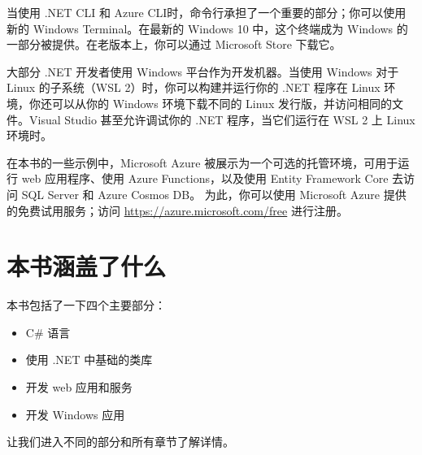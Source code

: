 当使用 .NET CLI 和 Azure CLI时，命令行承担了一个重要的部分；你可以使用新的 Windows Terminal。在最新的 Windows 10 中，这个终端成为 Windows 的一部分被提供。在老版本上，你可以通过 Microsoft Store 下载它。

大部分 .NET 开发者使用 Windows 平台作为开发机器。当使用 Windows 对于 Linux 的子系统（WSL 2）时，你可以构建并运行你的 .NET 程序在 Linux 环境，你还可以从你的 Windows 环境下载不同的 Linux 发行版，并访问相同的文件。Visual Studio 甚至允许调试你的 .NET 程序，当它们运行在 WSL 2 上 Linux 环境时。

在本书的一些示例中，Microsoft Azure 被展示为一个可选的托管环境，可用于运行 web 应用程序、使用 Azure Functions，以及使用 Entity Framework Core 去访问 SQL Server 和 Azure Cosmos DB。
为此，你可以使用 Microsoft Azure 提供的免费试用服务；访问 \url{https://azure.microsoft.com/free} 进行注册。

\section*{本书涵盖了什么}
本书包括了一下四个主要部分：
\begin{itemize}
    \item C\# 语言
    \item 使用 .NET 中基础的类库
    \item 开发 web 应用和服务
    \item 开发 Windows 应用
\end{itemize}
让我们进入不同的部分和所有章节了解详情。

